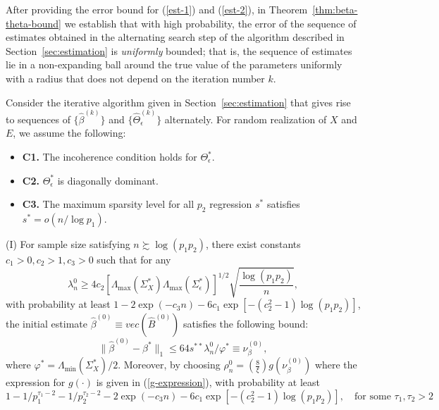 %
%
%
%

\medskip
After providing the error bound for (\ref{est-1}) and (\ref{est-2}), in Theorem~\ref{thm:beta-theta-bound} we establish that with high probability, the error of the sequence of estimates obtained in the alternating search step of the algorithm described in Section~\ref{sec:estimation} is {\em uniformly} bounded; that is, the sequence of estimates lie in a non-expanding ball around the true value of the parameters uniformly with a radius that does not depend on the iteration number $k$. 

\begin{theorem}\label{thm:beta-theta-bound}
Consider the iterative algorithm given in Section~\ref{sec:estimation} that gives rise to sequences of $\{\widehat{\beta}^{(k)}\}$ and $\{\widehat{\Theta}_\epsilon^{(k)}\}$ alternately. For random realization of $X$ and $E$, we assume the following:
\begin{itemize}
\item[] \textbf{C1.} The incoherence condition holds for $\Theta^*_\epsilon$.
\item[] \textbf{C2.} $\Theta^*_\epsilon$ is diagonally dominant.
\item[] \textbf{C3.} The maximum sparsity level for all $p_2$ regression $s^*$ satisfies $s^*=o(n/\log p_1)$.
\end{itemize}
(I) For sample size satisfying $n\succsim \log(p_1p_2)$, there exist constants $c_1>0,c_2>1,c_3>0$ such that for any
\begin{equation*}
\lambda_n^0\geq 4c_2\left[\Lambda_{\max}(\Sigma_X^*)\Lambda_{\max}(\Sigma_\epsilon^*)\right]^{1/2}\sqrt{\frac{\log(p_1p_2)}{n}},
\end{equation*}
with probability at least $1-2\exp(-c_3n)-6c_1\exp[-(c_2^2-1)\log(p_1p_2)]$, the initial estimate $\widehat{\beta}^{(0)}\equiv vec(\widehat{B}^{(0)})$ satisfies the following bound:  
\begin{equation}\label{eqn:beta0bound}
\|\widehat{\beta}^{(0)} - \beta^*\|_1 \leq 64 s^{**}\lambda_n^0/\varphi^*\equiv \nu_\beta^{(0)},
\end{equation}
where $\varphi^* = \Lambda_{\min}(\Sigma_X^*)/2$. Moreover, by choosing $\rho_n^{0} = (\frac{8}{\xi})g(\nu_\beta^{(0)})$ where the expression for $g(\cdot)$ is given in (\ref{g-expression}), with probability at least $$ 1-1/p_1^{\tau_1-2}-1/p_2^{\tau_2-2}-2\exp(-c_3n) - 6c_1\exp[-(c_2^2-1)\log (p_1p_2)],\quad \text{for some }\tau_1,\tau_2>2$$ 

\end{theorem}
